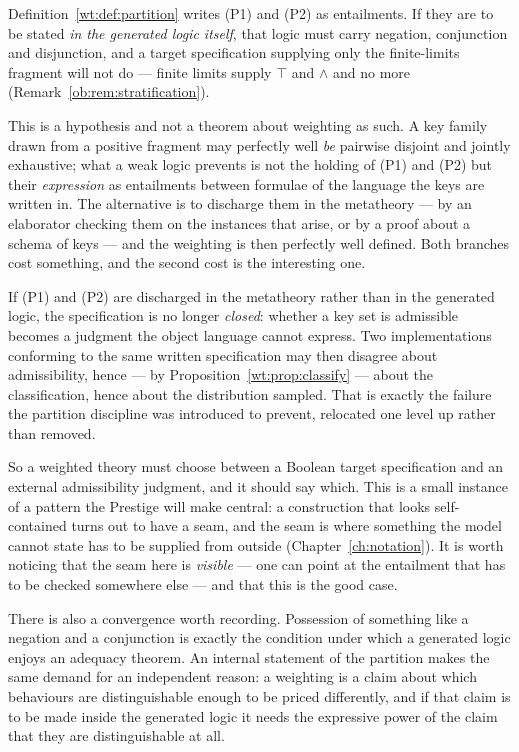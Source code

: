 Definition~\ref{wt:def:partition} writes (P1) and (P2) as entailments. If they are to be
stated \emph{in the generated logic itself}, that logic must carry negation, conjunction
and disjunction, and a target specification supplying only the finite-limits fragment
will not do --- finite limits supply $\top$ and $\wedge$ and no more
(Remark~\ref{ob:rem:stratification}).

This is a hypothesis and not a theorem about weighting as such. A key family drawn from a
positive fragment may perfectly well \emph{be} pairwise disjoint and jointly exhaustive;
what a weak logic prevents is not the holding of (P1) and (P2) but their \emph{expression}
as entailments between formulae of the language the keys are written in. The alternative
is to discharge them in the metatheory --- by an elaborator checking them on the instances
that arise, or by a proof about a schema of keys --- and the weighting is then perfectly
well defined. Both branches cost something, and the second cost is the interesting one.

\begin{observation}
\label{wt:obs:closure}
If (P1) and (P2) are discharged in the metatheory rather than in the generated logic, the
specification is no longer \emph{closed}: whether a key set is admissible becomes a
judgment the object language cannot express. Two implementations conforming to the same
written specification may then disagree about admissibility, hence --- by
Proposition~\ref{wt:prop:classify} --- about the classification, hence about the
distribution sampled. That is exactly the failure the partition discipline was introduced
to prevent, relocated one level up rather than removed.
\end{observation}

So a weighted theory must choose between a Boolean target specification and an external
admissibility judgment, and it should say which. This is a small instance of a pattern the
Prestige will make central: a construction that looks self-contained turns out to have a
seam, and the seam is where something the model cannot state has to be supplied from
outside (Chapter~\ref{ch:notation}). It is worth noticing that the seam here is
\emph{visible} --- one can point at the entailment that has to be checked somewhere else
--- and that this is the good case.

There is also a convergence worth recording. Possession of something like a negation and a
conjunction is exactly the condition under which a generated logic enjoys an adequacy
theorem. An internal statement of the partition makes the same demand for an independent
reason: a weighting is a claim about which behaviours are distinguishable enough to be
priced differently, and if that claim is to be made inside the generated logic it needs
the expressive power of the claim that they are distinguishable at all.

